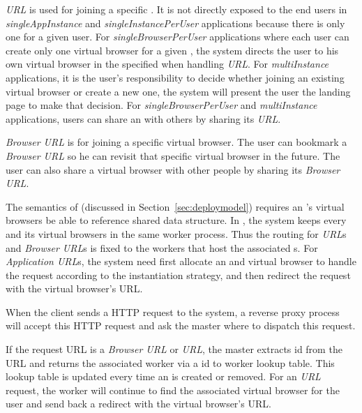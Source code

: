 \emph{\appins{} URL} is used for joining  a specific \appins{}.  
It is not
directly exposed to the end users in \emph{singleAppInstance}   and
\emph{singleInstancePerUser} applications because there is only one \appins{}
for a given user. 
For \emph{singleBrowserPerUser} applications where each user
can create only  one virtual browser for a given \appins{}, the system directs
the user to his own virtual browser in the specified \appins{} when handling
\emph{\appins{} URL}. 
For \emph{multiInstance}
applications, it is the user's responsibility to decide whether joining an
existing virtual browser or create a new one,
 the system will present the user the landing page to make that decision. 
For \emph{singleBrowserPerUser}
and \emph{multiInstance} applications, users can share an \appins{} with
others by sharing its \emph{\appins{} URL}.

\emph{Browser URL} is for joining a specific virtual browser. The user can
bookmark a \emph{Browser URL} so he can revisit that specific  virtual browser
in the future. The user can also share a virtual browser with other people by
sharing its \emph{Browser URL}.

The semantics of \appins (discussed in Section~\ref{sec:deploymodel})
requires an \appins{}'s virtual browsers be able to reference shared data structure.
In \cbtwo, the system keeps every \appins and its virtual browsers in the same worker process.
Thus the routing for \emph{\appins{} URL}s and \emph{Browser URL}s is fixed to 
the workers that host the associated \appins{}s.
For \emph{Application URL}s, the system need first allocate an \appins{} and virtual
browser to handle the request according to the instantiation strategy, and then
redirect the request with the virtual browser's URL.



When the client sends a HTTP request to the system, a reverse proxy process
will accept this HTTP request and ask the master where to dispatch this
request. 

If the request URL is a \emph{Browser URL} or \emph{\appins URL}, 
the master extracts \appins id from the URL and returns the associated
worker via a \appins id to worker lookup table.
This lookup table is updated every time an \appins{} is created or removed.
For an \emph{\appins URL} request, the worker will continue to find the associated
virtual browser for the user and send back a redirect with the virtual browser's URL.

